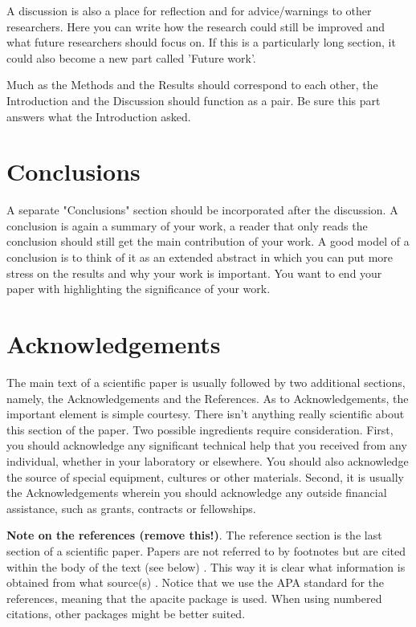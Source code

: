 \documentclass[a4paper]{article}
\begin{document}
\noindent A discussion is also a place for reflection and for advice/warnings to other researchers. Here you can write how the research could still be improved and what future researchers should focus on. If this is a particularly long section, it could also become a new part called 'Future work'.

Much as the Methods and the Results should correspond to each other, the Introduction and the Discussion should function as a pair. Be sure this part answers what the Introduction asked. 

\section{Conclusions}
\label{sec:conclusions}
A separate "Conclusions" section should  be incorporated after the discussion. A conclusion is again  a summary of your work, a reader that only reads the conclusion should still get the main contribution of your work. A good model of a conclusion is to think of it as an extended abstract in which you can put more stress on the results and why your work is important. You want to end your paper with highlighting the significance of your work.

\section{Acknowledgements}
\label{sec:acknow}
The main text of a scientific paper is usually followed by two additional sections, namely, the Acknowledgements and the References.
As to Acknowledgements, the important element is simple courtesy. There isn't anything really scientific about this section of the paper. Two possible ingredients require consideration. First, you should acknowledge any significant technical help that you received from any individual, whether in your laboratory or elsewhere. You should also acknowledge the source of special equipment, cultures or other materials. Second, it is usually the Acknowledgements wherein you should acknowledge any outside financial assistance, such as grants, contracts or fellowships.


\vspace{2em}
\noindent 
\textbf{Note on the references (remove this!)}. The reference section is the last section of a scientific paper. 
Papers are not referred to by footnotes but are cited within the body of the text (see below) \cite{day:book06}.
This way it is clear what information is obtained from what source(s) \cite{allay:book95}.
Notice that we use the APA standard for the references, meaning that the apacite package is used. When using numbered citations, other packages might be better suited.



\end{document}
